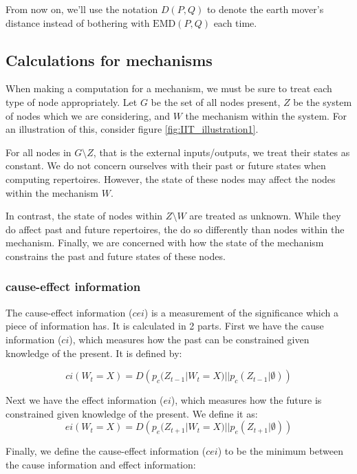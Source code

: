 From now on, we'll use the notation $D(P,Q)$ to denote the earth mover's distance instead of bothering with $\text{EMD}(P,Q)$ each time.

\subsection{Calculations for mechanisms}\label{sec:little_phi}
When making a computation for a mechanism, we must be sure to treat each type of node appropriately. Let $G$ be the set of all nodes present, $Z$ be the system of nodes which we are considering, and $W$ the mechanism within the system. For an illustration of this, consider figure \ref{fig:IIT_illustration1}.

For all nodes in $G\setminus Z$, that is the external inputs/outputs, we treat their states as constant. We do not concern ourselves with their past or future states when computing repertoires. However, the state of these nodes may affect the nodes within the mechanism $W$.

In contrast, the state of nodes within $Z \setminus W$ are treated as unknown. While they do affect past and future repertoires, the do so differently than nodes within the mechanism. Finally, we are concerned with how the state of the mechanism constrains the past and future states of these nodes.

\subsubsection{cause-effect information}
The cause-effect information ($cei$) is a measurement of the significance which a piece of information has. It is calculated in 2 parts. First we have the cause information ($ci$), which measures how the past can be constrained given knowledge of the present. It is defined by:

\begin{equation}
\label{def:ci}
ci(W_{t} = X) = D\left(p_c(Z_{t-1}|W_{t} = X)||p_c(Z_{t-1}|\emptyset)\right)
\end{equation}


Next we have the effect information ($ei$), which measures how the future is constrained given knowledge of the present. We define it as:
\begin{equation}
\label{def:ei}
ei(W_{t} = X) = D\left(p_e(Z_{t+1}|W_{t} = X)||p_{e}(Z_{t+1}|\emptyset)\right)
\end{equation}

Finally, we define the cause-effect information ($cei$) to be the minimum between the cause information and effect information:

